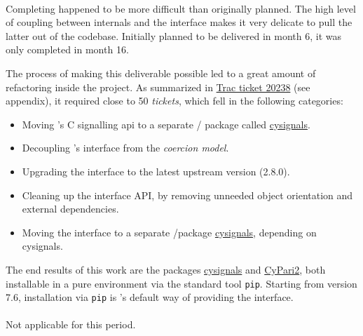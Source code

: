 \documentclass{deliverablereport}
\begin{document}
\paragraph{}
\label{UI@pari-python}

Completing  happened to be more difficult than
originally planned. The high level of coupling between \Sage internals
and the \Pari interface makes it very delicate to pull the latter out
of the \Sage codebase. Initially planned to be delivered in month 6,
it was only completed in month 16.

The process of making this deliverable possible led to a great amount
of refactoring inside the \Sage project. As summarized in
\href{http://trac.sagemath.org/ticket/20238}{Trac ticket 20238} (see
appendix), it required close to 50 \emph{tickets}, which fell in the
following categories:

\begin{itemize}
\tightlist
\item Moving \Sage's C signalling api to a separate \Python/\Cython
  package called
  \href{https://github.com/sagemath/cysignals}{cysignals}.
\item Decoupling \Sage's \Pari interface from the \emph{coercion
    model}.
\item Upgrading the \Pari interface to the latest upstream version
  (2.8.0).
\item Cleaning up the \Pari interface API, by removing unneeded object
  orientation and external dependencies.
\item Moving the \Pari interface to a separate \Python/\Cython package
  \href{https://github.com/sagemath/cysignals}{cysignals}, depending
  on cysignals.
\end{itemize}

The end results of this work are the packages
\href{https://github.com/sagemath/cysignals}{cysignals} and
\href{https://github.com/sagemath/cypari2}{CyPari2}, both installable
in a pure \Python environment via the standard tool
\texttt{pip}. Starting from version 7.6, installation via \texttt{pip}
is \Sage's default way of providing the \Pari interface.

\paragraph{} %

Not applicable for this period.
\end{document}
